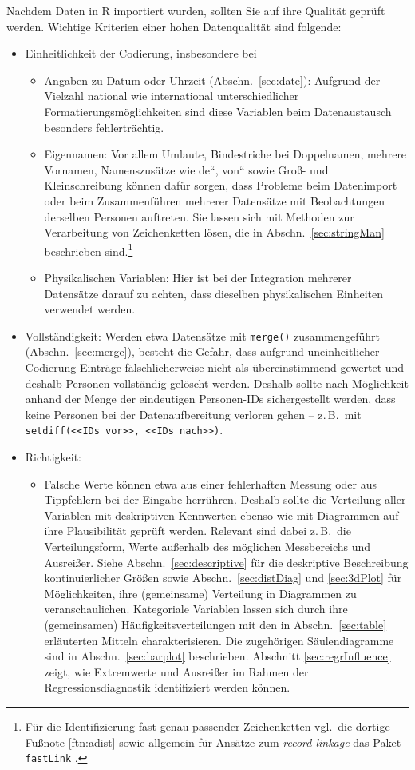 Nachdem Daten in R importiert wurden, sollten Sie auf ihre Qualität geprüft werden. Wichtige Kriterien einer hohen Datenqualität sind folgende:
\begin{itemize}
\item Einheitlichkeit der Codierung, insbesondere bei
\begin{itemize}
\item Angaben zu Datum oder Uhrzeit (Abschn.\ \ref{sec:date}): Aufgrund der Vielzahl national wie international unterschiedlicher Formatierungsmöglichkeiten sind diese Variablen beim Datenaustausch besonders fehlerträchtig.
\item Eigennamen: Vor allem Umlaute, Bindestriche bei Doppelnamen, mehrere Vornamen, Namenszusätze wie {\quotedblbase}de{\textquotedblleft}, {\quotedblbase}von{\textquotedblleft} sowie Groß- und Kleinschreibung können dafür sorgen, dass Probleme beim Datenimport oder beim Zusammenführen mehrerer Datensätze mit Beobachtungen derselben Personen auftreten. Sie lassen sich mit Methoden zur Verarbeitung von Zeichenketten lösen, die in Abschn.\ \ref{sec:stringMan} beschrieben sind.\footnote{\label{ftn:recLink}Für die Identifizierung fast genau passender Zeichenketten vgl.\ die dortige Fußnote \ref{ftn:adist} sowie allgemein für Ansätze zum \emph{record linkage} das Paket \lstinline!fastLink! \cite{Enamorado2018}.}
\item Physikalischen Variablen: Hier ist bei der Integration mehrerer Datensätze darauf zu achten, dass dieselben physikalischen Einheiten verwendet werden.
\end{itemize}
\item Vollständigkeit: Werden etwa Datensätze mit \lstinline!merge()! zusammengeführt (Abschn.\ \ref{sec:merge}), besteht die Gefahr, dass aufgrund uneinheitlicher Codierung Einträge fälschlicherweise nicht als übereinstimmend gewertet und deshalb Personen vollständig gelöscht werden. Deshalb sollte nach Möglichkeit anhand der Menge der eindeutigen Personen-IDs sichergestellt werden, dass keine Personen bei der Datenaufbereitung verloren gehen -- z.\,B.\ mit \lstinline!setdiff(<<IDs vor>>, <<IDs nach>>)!.
\item Richtigkeit:
\begin{itemize}
\item Falsche Werte können etwa aus einer fehlerhaften Messung oder aus Tippfehlern bei der Eingabe herrühren. Deshalb sollte die Verteilung aller Variablen mit deskriptiven Kennwerten ebenso wie mit Diagrammen auf ihre Plausibilität geprüft werden. Relevant sind dabei z.\,B.\ die Verteilungsform, Werte außerhalb des möglichen Messbereichs und Ausreißer. Siehe Abschn.\ \ref{sec:descriptive} für die deskriptive Beschreibung kontinuierlicher Größen sowie Abschn.\ \ref{sec:distDiag} und \ref{sec:3dPlot} für Möglichkeiten, ihre (gemeinsame) Verteilung in Diagrammen zu veranschaulichen. Kategoriale Variablen lassen sich durch ihre (gemeinsamen) Häufigkeitsverteilungen mit den in Abschn.\ \ref{sec:table} erläuterten Mitteln charakterisieren. Die zugehörigen Säulendiagramme sind in Abschn.\ \ref{sec:barplot} beschrieben. Abschnitt \ref{sec:regrInfluence} zeigt, wie Extremwerte und Ausreißer im Rahmen der Regressionsdiagnostik identifiziert werden können.

\end{itemize}
\end{itemize}
